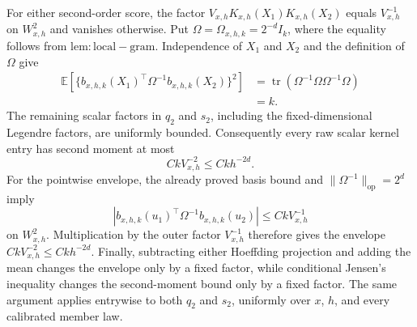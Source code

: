 For either second-order score, the factor \(V_{x,h}K_{x,h}(X_1)K_{x,h}(X_2)\) equals \(V_{x,h}^{-1}\) on \(W_{x,h}^2\) and vanishes otherwise. Put \(\Omega=\Omega_{x,h,k}=2^{-d}I_k\), where the equality follows from \(\mathrm{lem:local-gram}\). Independence of \(X_1\) and \(X_2\) and the definition of \(\Omega\) give
\[
 \begin{aligned}
 \mathbb E\!\left[\{b_{x,h,k}(X_1)^\top\Omega^{-1}b_{x,h,k}(X_2)\}^2\right]
 &=\operatorname{tr}\!\left(\Omega^{-1}\Omega\Omega^{-1}\Omega\right)\\
 &=k.
 \end{aligned}
\]
The remaining scalar factors in \(q_2\) and \(s_2\), including the fixed-dimensional Legendre factors, are uniformly bounded. Consequently every raw scalar kernel entry has second moment at most
\[
 CkV_{x,h}^{-2}\le Ckh^{-2d}.
\]
For the pointwise envelope, the already proved basis bound and \(\|\Omega^{-1}\|_{\mathrm{op}}=2^d\) imply
\[
 |b_{x,h,k}(u_1)^\top\Omega^{-1}b_{x,h,k}(u_2)|
 \le CkV_{x,h}^{-1}
\]
on \(W_{x,h}^2\). Multiplication by the outer factor \(V_{x,h}^{-1}\) therefore gives the envelope \(CkV_{x,h}^{-2}\le Ckh^{-2d}\). Finally, subtracting either Hoeffding projection and adding the mean changes the envelope only by a fixed factor, while conditional Jensen's inequality changes the second-moment bound only by a fixed factor. The same argument applies entrywise to both \(q_2\) and \(s_2\), uniformly over \(x\), \(h\), and every calibrated member law.